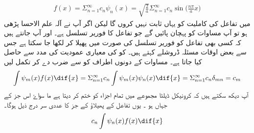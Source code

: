 \begin{enumerate}
\begin{align}
f(x)=\Sigma_{n=1}^{\infty}c_{n}\psi_{n}(x)=\sqrt{\frac{2}{a}}\Sigma_{n=1}^{\infty}c_{n}\sin\big(\frac{n\pi}{a}x\big)
\end{align}
 میں تفاعل    کی کاملیت کو یہاں ثابت نہیں کروں گا لیکن اگر آپ نے آلہ علم الاحسا پڑھی ہو تو آپ مساوات  کو پہچان پائیں گے جو تفاعل کا فوریر تسلسل ہے۔ اور آپ جانتے ہیں کہ کسی بھی تفاعل کو فوریر تسلسل کی صورت میں پھیلا کر لکھا جا سکتا ہے جس سے بعض اوقات مسئلہ ڈروشلے کہتے ہیں۔   کو   کی معیاری عمودیت کی مدد سے حاصل کیا جاتا ہے۔ مساوات  کے دونوں اطراف کو  سے ضرب دے کر تکمل لیں
 \begin{align}
\int \psi_{m}(x)f(x)\dif{x}=\Sigma_{n=1}^{\infty}c_{n}\int\psi_{m}(x)\psi_{n}(x)\dif{x}=\Sigma_{n=1}^{\infty}c_{n}\delta_{mn}=c_{m}
\end{align}
آپ دیکھ سکتے ہیں کہ کرونیکل ڈیلٹا مجموعے میں تمام اجزاء کو ختم کر دیتا ہے ما سواۓ اس جز کے جہاں   ہو ۔ یوں تفاعل    کے پھیلاؤ کے جز کا عددی سر درج ذیل ہوگا۔
\begin{align}
c_{n}\int\psi_{n}(x)f(x)\dif{x}
\end{align}
\end{enumerate}


